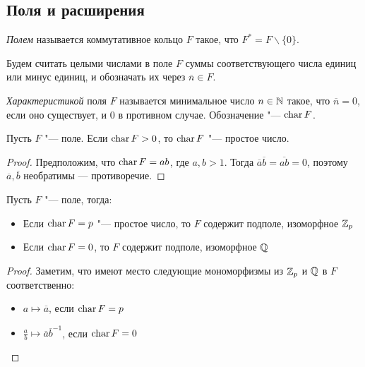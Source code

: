 \subsection{Поля и расширения}

\begin{definition}
	\textit{Полем} называется коммутативное кольцо $F$ такое, что $F^* = F \backslash \{0\}$.
\end{definition}

\begin{note}
	Будем считать целыми числами в поле $F$ суммы соответствующего числа единиц или минус единиц, и обозначать их через $\overline{n} \in F$.
\end{note}

\pagebreak

\begin{definition}
	\textit{Характеристикой} поля $F$ называется минимальное число $n \in \mathbb{N}$ такое, что $\overline{n} = 0$, если оно существует, и $0$ в противном случае. Обозначение "--- $\operatorname{char}{F}$.
\end{definition}

\begin{proposition}
	Пусть $F$ "--- поле. Если $\operatorname{char}{F} > 0$, то $\operatorname{char}{F}$ "--- простое число.
\end{proposition}

\begin{proof}
	Предположим, что $\operatorname{char}{F} = ab$, где $a, b > 1$. Тогда $\overline{a}\overline{b} = \overline{ab} = 0$, поэтому $\overline{a}, \overline{b}$ необратимы --- противоречие.
\end{proof}

\begin{theorem}
	Пусть $F$ "--- поле, тогда:
	\begin{itemize}
		\item Если $\operatorname{char}{F} = p$ "--- простое число, то $F$ содержит подполе, изоморфное $\mathbb{Z}_p$
		\item Если $\operatorname{char}{F} = 0$, то $F$ содержит подполе, изоморфное $\mathbb{Q}$
	\end{itemize}
\end{theorem}

\begin{proof}
	Заметим, что имеют место следующие мономорфизмы из $\mathbb{Z}_p$ и $\mathbb{Q}$ в $F$ соответственно:
	\begin{itemize}
		\item $a \mapsto \overline{a}$, если $\operatorname{char}{F} = p$
		\item $\frac{a}{b} \mapsto \overline{a}\overline{b}^{-1}$, если $\operatorname{char}{F} = 0$\qedhere
	\end{itemize}
\end{proof}

